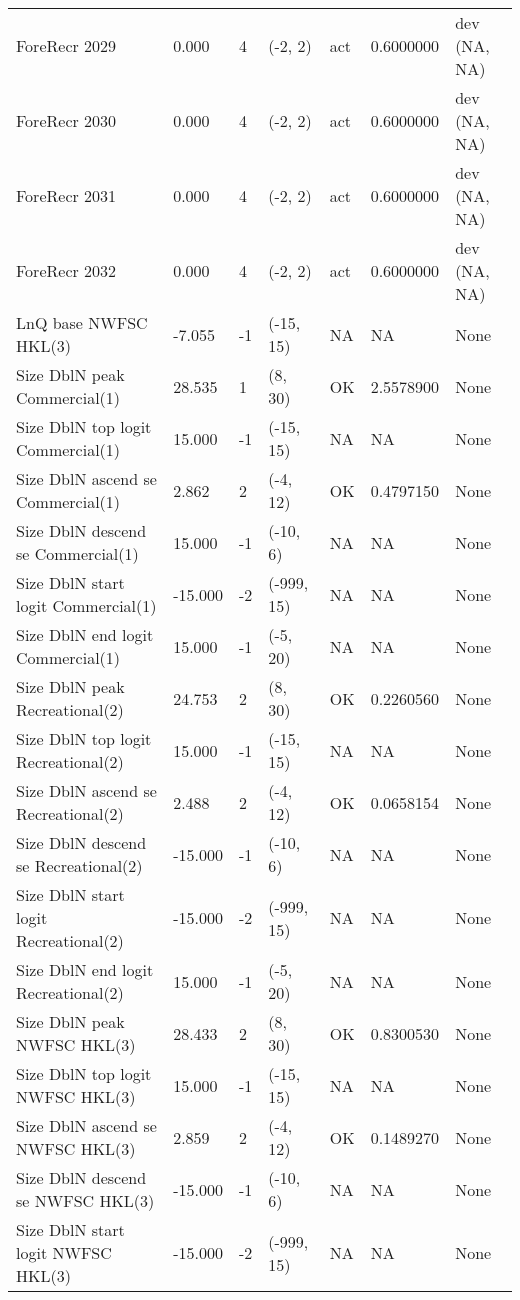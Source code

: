 \documentclass[11pt,
  english,
  a4paper,
]{article}
\begin{document}
\begin{landscape}
\begin{longtable}[t]{>{\raggedright\arraybackslash}p{6cm}lllll>{\raggedright\arraybackslash}p{4cm}}
ForeRecr 2029 & 0.000 & 4 & (-2, 2) & act & 0.6000000 & dev (NA, NA)\\
ForeRecr 2030 & 0.000 & 4 & (-2, 2) & act & 0.6000000 & dev (NA, NA)\\
ForeRecr 2031 & 0.000 & 4 & (-2, 2) & act & 0.6000000 & dev (NA, NA)\\
ForeRecr 2032 & 0.000 & 4 & (-2, 2) & act & 0.6000000 & dev (NA, NA)\\
LnQ base NWFSC HKL(3) & -7.055 & -1 & (-15, 15) & NA & NA & None\\
Size DblN peak Commercial(1) & 28.535 & 1 & (8, 30) & OK & 2.5578900 & None\\
Size DblN top logit Commercial(1) & 15.000 & -1 & (-15, 15) & NA & NA & None\\
Size DblN ascend se Commercial(1) & 2.862 & 2 & (-4, 12) & OK & 0.4797150 & None\\
Size DblN descend se Commercial(1) & 15.000 & -1 & (-10, 6) & NA & NA & None\\
Size DblN start logit Commercial(1) & -15.000 & -2 & (-999, 15) & NA & NA & None\\
Size DblN end logit Commercial(1) & 15.000 & -1 & (-5, 20) & NA & NA & None\\
Size DblN peak Recreational(2) & 24.753 & 2 & (8, 30) & OK & 0.2260560 & None\\
Size DblN top logit Recreational(2) & 15.000 & -1 & (-15, 15) & NA & NA & None\\
Size DblN ascend se Recreational(2) & 2.488 & 2 & (-4, 12) & OK & 0.0658154 & None\\
Size DblN descend se Recreational(2) & -15.000 & -1 & (-10, 6) & NA & NA & None\\
Size DblN start logit Recreational(2) & -15.000 & -2 & (-999, 15) & NA & NA & None\\
Size DblN end logit Recreational(2) & 15.000 & -1 & (-5, 20) & NA & NA & None\\
Size DblN peak NWFSC HKL(3) & 28.433 & 2 & (8, 30) & OK & 0.8300530 & None\\
Size DblN top logit NWFSC HKL(3) & 15.000 & -1 & (-15, 15) & NA & NA & None\\
Size DblN ascend se NWFSC HKL(3) & 2.859 & 2 & (-4, 12) & OK & 0.1489270 & None\\
Size DblN descend se NWFSC HKL(3) & -15.000 & -1 & (-10, 6) & NA & NA & None\\
Size DblN start logit NWFSC HKL(3) & -15.000 & -2 & (-999, 15) & NA & NA & None\\

\end{longtable}
\end{landscape}
\end{document}
